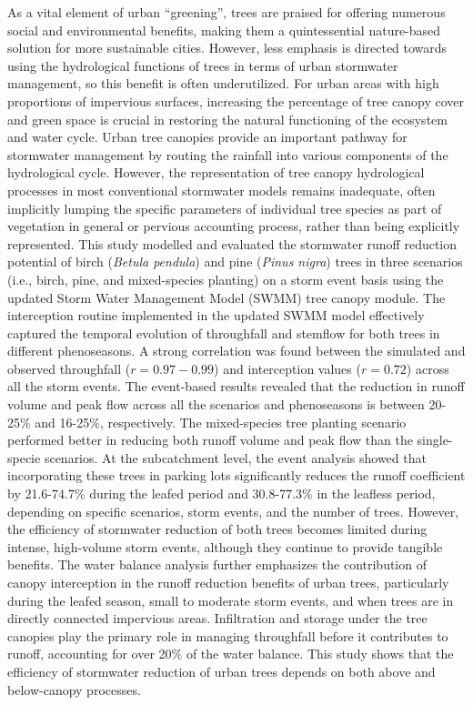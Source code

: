 As a vital element of urban “greening”, trees are praised for offering numerous social and
environmental benefits, making them a quintessential nature-based solution for more sustainable
cities. However, less emphasis is directed towards using the hydrological functions of trees in terms of
urban stormwater management, so this benefit is often underutilized. For urban areas with high
proportions of impervious surfaces, increasing the percentage of tree canopy cover and green space is
crucial in restoring the natural functioning of the ecosystem and water cycle. Urban tree canopies
provide an important pathway for stormwater management by routing the rainfall into various
components of the hydrological cycle. However, the representation of tree canopy hydrological
processes in most conventional stormwater models remains inadequate, often implicitly lumping the
specific parameters of individual tree species as part of vegetation in general or pervious accounting
process, rather than being explicitly represented. This study modelled and evaluated the stormwater
runoff reduction potential of birch (\textit{Betula pendula}) and pine (\textit{Pinus nigra}) trees in three scenarios
(i.e., birch, pine, and mixed-species planting) on a storm event basis using the updated Storm Water
Management Model (SWMM) tree canopy module. The interception routine implemented in the
updated SWMM model effectively captured the temporal evolution of throughfall and stemflow for
both trees in different phenoseasons. A strong correlation was found between the simulated and
observed throughfall ($r = 0.97-0.99$) and interception values ($r = 0.72$) across all the storm events. The
event-based results revealed that the reduction in runoff volume and peak flow across all the scenarios
and phenoseasons is between 20-25\% and 16-25\%, respectively. The mixed-species tree planting
scenario performed better in reducing both runoff volume and peak flow than the single-specie
scenarios. At the subcatchment level, the event analysis showed that incorporating these trees in
parking lots significantly reduces the runoff coefficient by 21.6-74.7\% during the leafed period and
30.8-77.3\% in the leafless period, depending on specific scenarios, storm events, and the number of
trees. However, the efficiency of stormwater reduction of both trees becomes limited during intense,
high-volume storm events, although they continue to provide tangible benefits. The water balance
analysis further emphasizes the contribution of canopy interception in the runoff reduction benefits of
urban trees, particularly during the leafed season, small to moderate storm events, and when trees are
in directly connected impervious areas. Infiltration and storage under the tree canopies play the
primary role in managing throughfall before it contributes to runoff, accounting for over 20\% of the
water balance. This study shows that the efficiency of stormwater reduction of urban trees depends on
both above and below-canopy processes.

